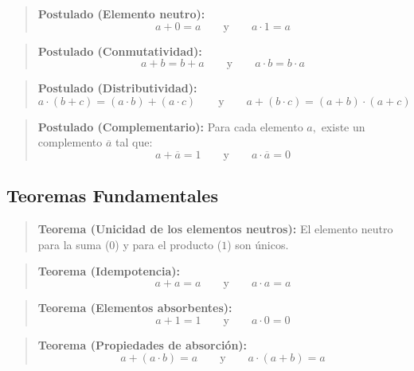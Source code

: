 \setcounter{tcb@cnt@postulado}{0}
\begin{quote}\textbf{Postulado (Elemento neutro):}\label{neutro_eng}
\[ a + 0 = a \qquad \text{y} \qquad a \cdot 1 = a \]
\end{quote}

\setcounter{tcb@cnt@postulado}{2}
\begin{quote}\textbf{Postulado (Conmutatividad):}\label{conmut_eng}
\[ a + b = b + a \qquad \text{y} \qquad a \cdot b = b \cdot a \]
\end{quote}

\setcounter{tcb@cnt@postulado}{4}
\begin{quote}\textbf{Postulado (Distributividad):}\label{distrib_eng}
\[ a \cdot (b + c) = (a \cdot b) + (a \cdot c) \qquad \text{y} \qquad a + (b \cdot c) = (a + b) \cdot (a + c) \]
\end{quote}

\setcounter{tcb@cnt@postulado}{6}
\begin{quote}\textbf{Postulado (Complementario):}\label{comp_eng}
Para cada elemento $a,$ existe un complemento $\overline{a}$ tal que:
\[ a + \overline{a} = 1 \qquad \text{y} \qquad a \cdot \overline{a} = 0 \]
\end{quote}

\subsection*{Teoremas Fundamentales}

\setcounter{tcb@cnt@teorema}{0}
\begin{quote}\textbf{Teorema (Unicidad de los elementos neutros):}\label{unicidad_neutros_eng}
El elemento neutro para la suma ($0$) y para el producto ($1$) son únicos.
\end{quote}

\setcounter{tcb@cnt@teorema}{1}
\begin{quote}\textbf{Teorema (Idempotencia):}\label{idempotencia_eng}
\[ a + a = a \qquad \text{y} \qquad a \cdot a = a \]
\end{quote}

\setcounter{tcb@cnt@teorema}{2}
\begin{quote}\textbf{Teorema (Elementos absorbentes):}\label{absorbentes_eng}
\[ a + 1 = 1 \qquad \text{y} \qquad a \cdot 0 = 0 \]
\end{quote}

\setcounter{tcb@cnt@teorema}{5}
\begin{quote}\textbf{Teorema (Propiedades de absorción):}\label{absorcion_eng}
\[ a + (a \cdot b) = a \qquad \text{y} \qquad a \cdot (a + b) = a \]
\end{quote}

